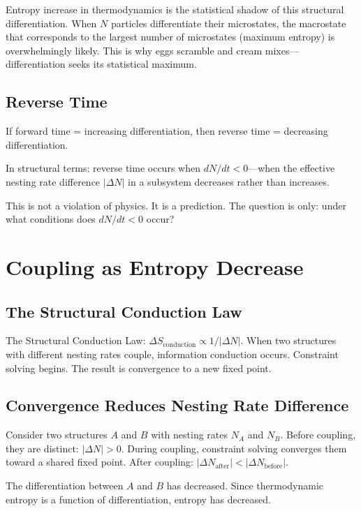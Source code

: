 \documentclass[12pt,a4paper]{article}
\begin{document}
Entropy increase in thermodynamics is the statistical shadow of this structural differentiation. When $N$ particles differentiate their microstates, the macrostate that corresponds to the largest number of microstates (maximum entropy) is overwhelmingly likely. This is why eggs scramble and cream mixes---differentiation seeks its statistical maximum.

\subsection{Reverse Time}

If forward time = increasing differentiation, then reverse time = decreasing differentiation.

In structural terms: reverse time occurs when $dN/dt < 0$---when the effective nesting rate difference $|\Delta N|$ in a subsystem decreases rather than increases.

This is not a violation of physics. It is a prediction. The question is only: under what conditions does $dN/dt < 0$ occur?

\section{Coupling as Entropy Decrease}

\subsection{The Structural Conduction Law}

The Structural Conduction Law: $\Delta S_\text{conduction} \propto 1/|\Delta N|$. When two structures with different nesting rates couple, information conduction occurs. Constraint solving begins. The result is convergence to a new fixed point.

\subsection{Convergence Reduces Nesting Rate Difference}

Consider two structures $A$ and $B$ with nesting rates $N_A$ and $N_B$. Before coupling, they are distinct: $|\Delta N| > 0$. During coupling, constraint solving converges them toward a shared fixed point. After coupling: $|\Delta N_\text{after}| < |\Delta N_\text{before}|$.

The differentiation between $A$ and $B$ has decreased. Since thermodynamic entropy is a function of differentiation, entropy has decreased.
\end{document}
